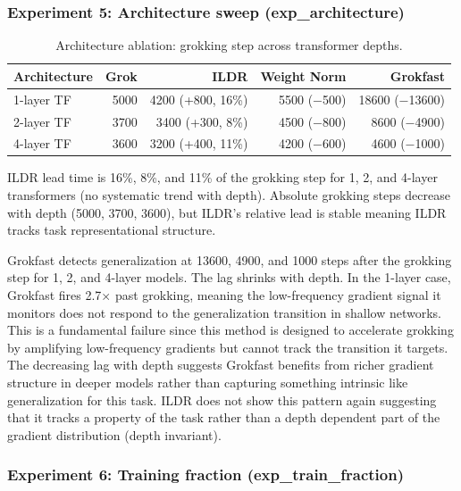 \documentclass{article}
\begin{document}
\subsubsection{Experiment 5: Architecture sweep (exp\_architecture)}

\begin{table}[H]
\centering
\begin{tabular}{lrrrr}
\hline
Architecture & Grok & ILDR & Weight Norm & Grokfast \\
\hline
1-layer TF & 5000 & 4200 (+800, 16\%)  & 5500 ($-$500)  & 18600 ($-$13600) \\
2-layer TF & 3700 & 3400 (+300, 8\%)   & 4500 ($-$800)  & 8600 ($-$4900)  \\
4-layer TF & 3600 & 3200 (+400, 11\%)  & 4200 ($-$600)  & 4600 ($-$1000)  \\
\hline
\end{tabular}
\caption{Architecture ablation: grokking step across transformer depths.}
\label{tab:arch_ablation}
\end{table}

ILDR lead time is 16\%, 8\%, and 11\% of the grokking step for 1, 2, and 4-layer transformers (no systematic trend with depth). Absolute grokking steps decrease with depth (5000, 3700, 3600), but ILDR's relative lead is stable meaning ILDR tracks task representational structure.

\vspace{3pt}

Grokfast detects generalization at 13600, 4900, and 1000 steps after the grokking step for 1, 2, and 4-layer models. The lag shrinks with depth. In the 1-layer case, Grokfast fires 2.7× past grokking, meaning the low-frequency gradient signal it monitors does not respond to the generalization transition in shallow networks. This is a fundamental failure since this method is designed to accelerate grokking by amplifying low-frequency gradients but cannot track the transition it targets. The decreasing lag with depth suggests Grokfast benefits from richer gradient structure in deeper models rather than capturing something intrinsic like generalization for this task. 
ILDR does not show this pattern again suggesting that it tracks a property of the task rather than a depth dependent part of the gradient distribution (depth invariant).



\subsubsection{Experiment 6: Training fraction (exp\_train\_fraction)} 
\end{document}
